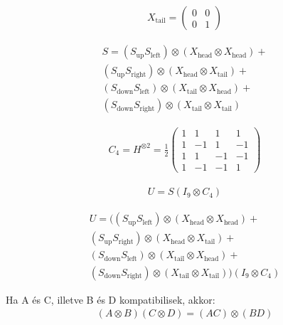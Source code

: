 \begin{align}
  X_{\text{tail}} =
  \begin{pmatrix}
    0 & 0 \\
    0 & 1
  \end{pmatrix}
\end{align}


\begin{align}
  S =
  (S_{\text{up}} S_{\text{left}}) \otimes (X_{\text{head}} \otimes X_{\text{head}}) +    \\
  (S_{\text{up}}  S_{\text{right}}) \otimes (X_{\text{head}} \otimes X_{\text{tail}}) +  \\
  (S_{\text{down}}  S_{\text{left}}) \otimes (X_{\text{tail}} \otimes X_{\text{head}}) + \\
  (S_{\text{down}} S_{\text{right}}) \otimes (X_{\text{tail}} \otimes X_{\text{tail}})
\end{align}

\begin{align}
  C_4 = H^{\otimes2} = \frac{1}{2}
  \begin{pmatrix}
    1 & 1  & 1  & 1  \\
    1 & -1 & 1  & -1 \\
    1 & 1  & -1 & -1 \\
    1 & -1 & -1 & 1
  \end{pmatrix}
\end{align}

\begin{align}
  U = S  (I_9 \otimes C_4)
\end{align}

\begin{align}
  U =
  ((S_{\text{up}}  S_{\text{left}}) \otimes (X_{\text{head}} \otimes X_{\text{head}}) +  \\
  (S_{\text{up}} S_{\text{right}}) \otimes (X_{\text{head}} \otimes X_{\text{tail}}) +   \\
  (S_{\text{down}}  S_{\text{left}}) \otimes (X_{\text{tail}} \otimes X_{\text{head}}) + \\
  (S_{\text{down}} S_{\text{right}}) \otimes (X_{\text{tail}} \otimes X_{\text{tail}}))
  (I_9 \otimes C_4)
\end{align}

Ha A és C, illetve B és D kompatibilisek, akkor:
\begin{align}
  (A \otimes B)(C \otimes D) = (AC) \otimes (BD)
\end{align}

